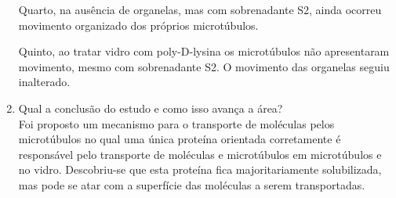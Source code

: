 \begin{enumerate}
        Quarto, na ausência de organelas, mas com sobrenadante S2, ainda ocorreu movimento organizado dos próprios microtúbulos.

        Quinto, ao tratar vidro com poly-D-lysina os microtúbulos não apresentaram movimento, mesmo com sobrenadante S2. O movimento das organelas seguiu inalterado.
    \item Qual a conclusão do estudo e como isso avança a área? \\
        Foi proposto um mecanismo para o transporte de moléculas pelos microtúbulos no qual uma única proteína orientada corretamente é responsável pelo transporte de moléculas e microtúbulos em microtúbulos e no vidro. Descobriu-se que esta proteína fica majoritariamente solubilizada, mas pode se atar com a superfície das moléculas a serem transportadas.
\end{enumerate}
